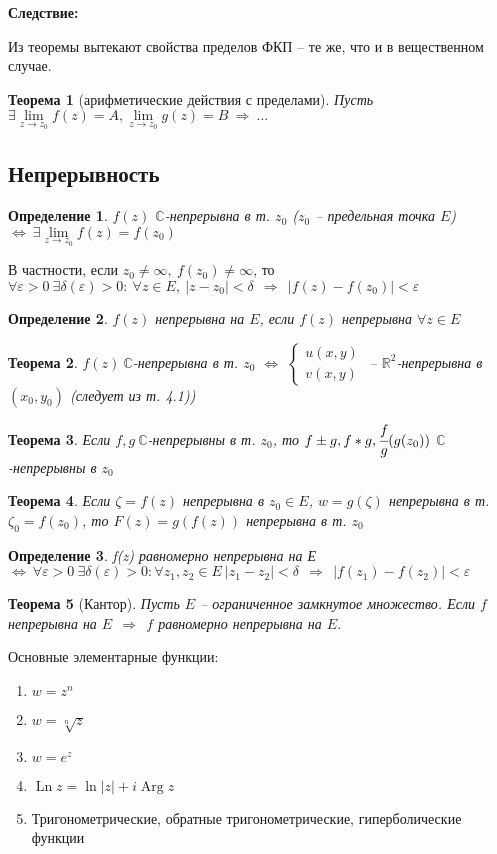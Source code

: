 \documentclass[final]{report}
\newcommand{\then}{\ \Rightarrow\ }
\newcommand{\R}{\mathbb{R}}
\renewcommand{\C}{\mathbb{C}}
\newcommand{\mlim}[1]{\underset{#1}{\lim}}
\newcommand{\LRA}{\Leftrightarrow}
\newcommand{\epsdelta}{\forall \e>0\ \exists \delta(\e)>0\colon}
\newcommand{\Ln}{\mathop{\mathrm{Ln}}\nolimits}
\newcommand{\Arg}{\mathop{\mathrm{Arg}}\nolimits}
\newcommand{\e}{\varepsilon}
\newcommand{\sys}[1]{\left\{\begin{matrix}#1\end{matrix}\right.}
\newcommand{\opr}[1]{\begin{opred}#1\end{opred}}
\newtheorem*{theor}{Теорема}
\newtheorem*{opred}{Определение}
\theoremstyle{remark}
\begin{document}
{\bfseries Следствие:}

Из теоремы вытекают свойства пределов ФКП -- те же, что и в вещественном случае.

\begin{theor}[арифметические действия с пределами]
Пусть $\exists \mlim{z\to z_0}f(z)=A, \mlim{z\to z_0}g(z)=B \then \ldots$
\end{theor}

\subsection{Непрерывность}

\opr{$f(z)$ $\C$-непрерывна в т. $z_0$ ($z_0$ -- предельная точка $E$) $\LRA\ \exists \mlim{z\to z_0}f(z)=f(z_0)$}

В частности, если $z_0\neq\infty,\ f(z_0)\neq\infty$, то $\epsdelta\ \forall z\in E,\ |z-z_0|<\delta\ \then\ |f(z)-f(z_0)|<\e$

\opr{$f(z)$ непрерывна на $E$, если $f(z)$ непрерывна $\forall z\in E$}

\begin{theor}
$f(z)\ \C$-непрерывна в т. $z_0$ $\LRA$ $\sys{u(x,y)\\v(x,y)}$ -- $\R^2$-непрерывна в $(x_0,y_0)$ (следует из т. 4.1))
\end{theor}

\begin{theor}
Если $f,g\ \C$-непрерывны в т. $z_0$, то $f\pm g, f*g, \cfrac fg (g(z_0))$ $\C$-непрерывны в $z_0$
\end{theor}

\begin{theor}
Если $\zeta=f(z)$ непрерывна в $z_0\in E$, $w=g(\zeta)$ непрерывна в т. $\zeta_0=f(z_0)$, то $F(z)=g(f(z))$ непрерывна в т. $z_0$
\end{theor}

\opr{f(z) равномерно непрерывна на Е $\LRA\ \epsdelta \forall z_1,z_2\in E\ |z_1-z_2|<\delta\ \then\ |f(z_1)-f(z_2)|<\e$}

\begin{theor}[Кантор]
Пусть $E$ -- ограниченное замкнутое множество. Если $f$ непрерывна на $E\ \then\ f$ равномерно непрерывна на $E$.
\end{theor}

Основные элементарные функции:
\begin{enumerate}
\item $w=z^n$
\item $w=\sqrt[n]{z}$
\item $w=e^z$
\item $\Ln z=\ln|z|+i\Arg z$
\item Тригонометрические, обратные тригонометрические, гиперболические функции
\end{enumerate}
\end{document}
